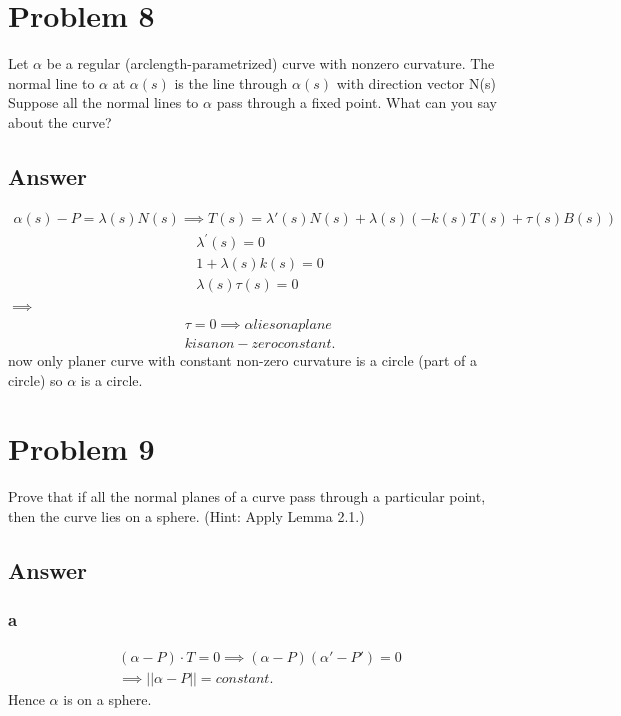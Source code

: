 \documentclass[
	12pt, %
]{fphw}
\theoremstyle{plain}
\begin{document}
\section*{Problem 8}
\begin{problem}
     Let $\alpha$ be a regular (arclength-parametrized) curve with nonzero curvature. The normal line to $\alpha$ at $\alpha(s)$
is the line through $\alpha(s)$ with direction vector N(s) Suppose all the normal lines to $\alpha$ pass through a fixed point. What can you say about the curve?
\end{problem}
\subsection*{Answer}
\begin{align*}
     \alpha(s) - P = \lambda(s)N(s) \implies T(s)=\lambda'(s)N(s) + \lambda(s)\left( -k(s)T(s) + \tau(s)B(s) \right)
 \end{align*}
 \begin{align*}
 \lambda^{'}(s)=0\\
 1+\lambda(s)k(s)=0\\
 \lambda(s)\tau(s)=0
 \end{align*}
     $\implies$
 \begin{align*}
 \tau=0 \implies \alpha  lies on a plane \\
 k is a non-zero constant.
 \end{align*}  
now only planer curve with constant non-zero curvature is a circle (part of a circle) so $\alpha$ is a circle.
 

\section*{Problem 9}
\begin{problem}
     Prove that if all the normal planes of a curve pass through a particular point, then the curve lies on a sphere. (Hint: Apply Lemma 2.1.)
\end{problem}
\subsection*{Answer}
\subsubsection*{a}
\begin{align*}
    \left( \alpha - P \right)\cdot T = 0 \implies \left( \alpha - P\right)\left( \alpha' - P'\right) = 0\\
    \implies ||\alpha - P|| = constant.
\end{align*}
Hence $\alpha$ is on a sphere.
\end{document}
